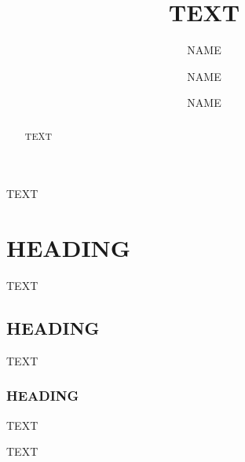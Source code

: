 \documentclass[journal abbreviation]{copernicus}
\begin{document}
\title{TEXT}


\author[]{NAME}
\author[]{NAME}
\author[]{NAME}










\received{}
\pubdiscuss{} %
\revised{}
\accepted{}
\published{}




\maketitle



\begin{abstract}
TEXT
\end{abstract}





\introduction
TEXT



\section{HEADING}
TEXT

\subsection{HEADING}
TEXT

\subsubsection{HEADING}
TEXT




\conclusions
TEXT
\end{document}
